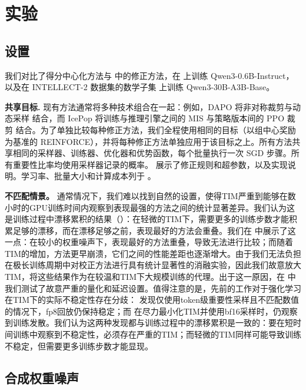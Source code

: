 \section{实验}
\label{sec:results}

\subsection{设置}
\label{sec:results_setup}

我们对比了得分中心化方法与  中的修正方法，在 \citep{stream_of_search} 上训练 Qwen3-0.6B-Instruct，以及在 {INTELLECT-2} 数据集的数学子集 \citep{intellect2} 上训练 Qwen3-30B-A3B-Base。

\noindent\textbf{共享目标.} 现有方法通常将多种技术组合在一起：例如，DAPO 将非对称裁剪与动态采样 \citep{dapo} 结合，而 IcePop 将训练与推理引擎之间的 MIS 与策略版本间的 PPO 裁剪 \citep{icepop} 结合。为了单独比较每种修正方法，我们全程使用相同的目标（以组中心奖励为基准的 REINFORCE），并将每种修正方法单独应用于该目标之上。所有方法共享相同的采样器、训练器、优化器和优势函数，每个批量执行一次 SGD 步骤。所有重要性比率均使用采样器记录的概率。 展示了修正规则和超参数，以及实现说明。学习率、批量大小和计算成本列于 。

\noindent\textbf{不匹配情景。} 通常情况下，我们难以找到自然的设置，使得TIM严重到能够在数小时的GPU训练时间内观察到表现最强的方法之间的统计显著差异。我们认为这是训练过程中漂移累积的结果（）：在轻微的TIM下，需要更多的训练步数才能积累足够的漂移，而在漂移足够之前，表现最好的方法会重叠。我们在  中展示了这一点：在较小的权重噪声下，表现最好的方法重叠，导致无法进行比较；而随着TIM的增加，方法更早崩溃，它们之间的性能差距也逐渐增大。由于我们无法负担在极长训练周期中对校正方法进行具有统计显著性的消融实验，因此我们故意放大TIM，将这些结果作为在较温和TIM下大规模训练的代理。出于这一原因，在  中我们测试了故意严重的量化和延迟设置。值得注意的是，先前的工作对于强化学习在TIM下的实际不稳定性存在分歧：\citet{fp8_rl} 发现仅使用token级重要性采样且不匹配数值的情况下，fp8回放仍保持稳定；而 \citet{mai_1} 在尽力最小化TIM并使用bf16采样时，仍观察到训练发散。我们认为这两种发现都与训练过程中的漂移累积是一致的：要在短时间训练中观察到不稳定性，必须存在严重的TIM；而轻微的TIM同样可能导致训练不稳定，但需要更多训练步数才能显现。

\subsection{合成权重噪声}
\label{sec:results_weight_noise}

